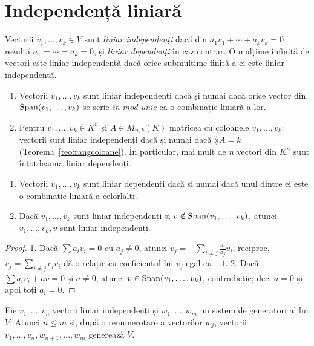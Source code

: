 \section{Independență liniară}

\begin{definitie}
Vectorii $v_1,\dots,v_k\in V$ sunt \emph{liniar independenți} dacă din $a_1v_1+\cdots+a_kv_k=0$ rezultă $a_1=\cdots=a_k=0$, și \emph{liniar dependenți} în caz contrar. O mulțime infinită de vectori este liniar independentă dacă orice submulțime finită a ei este liniar independentă.
\end{definitie}

\begin{observatie}
\begin{enumerate}
\item Vectorii $v_1,\dots,v_k$ sunt liniar independenți dacă și numai dacă orice vector din $\operatorname{Span}(v_1,\dots,v_k)$ se scrie \emph{în mod unic} ca o combinație liniară a lor.
\item Pentru $v_1,\dots,v_k\in K^n$ și $A\in M_{n,k}(K)$ matricea cu coloanele $v_1,\dots,v_k$: vectorii sunt liniar independenți dacă și numai dacă $\rang A=k$ (Teorema~\ref{teo:rangcoloane}). În particular, mai mult de $n$ vectori din $K^n$ sunt întotdeauna liniar dependenți.
\end{enumerate}
\end{observatie}

\begin{propozitie}\label{prop:dependenta}
\begin{enumerate}
\item Vectorii $v_1,\dots,v_k$ sunt liniar dependenți dacă și numai dacă unul dintre ei este o combinație liniară a celorlalți.
\item Dacă $v_1,\dots,v_k$ sunt liniar independenți și $v\notin\operatorname{Span}(v_1,\dots,v_k)$, atunci $v_1,\dots,v_k,v$ sunt liniar independenți.
\end{enumerate}
\end{propozitie}

\begin{proof}
1. Dacă $\sum a_iv_i=0$ cu $a_j\neq0$, atunci $v_j=-\sum_{i\neq j}\frac{a_i}{a_j}v_i$; reciproc, $v_j=\sum_{i\neq j}c_iv_i$ dă o relație cu coeficientul lui $v_j$ egal cu $-1$.
2. Dacă $\sum a_iv_i+av=0$ și $a\neq0$, atunci $v\in\operatorname{Span}(v_1,\dots,v_k)$, contradicție; deci $a=0$ și apoi toți $a_i=0$.
\end{proof}

\begin{lema}\label{lema:steinitz}
Fie $v_1,\dots,v_n$ vectori liniar independenți și $w_1,\dots,w_m$ un sistem de generatori al lui $V$. Atunci $n\le m$ și, după o renumerotare a vectorilor $w_j$, vectorii $v_1,\dots,v_n,w_{n+1},\dots,w_m$ generează $V$.
\end{lema}

